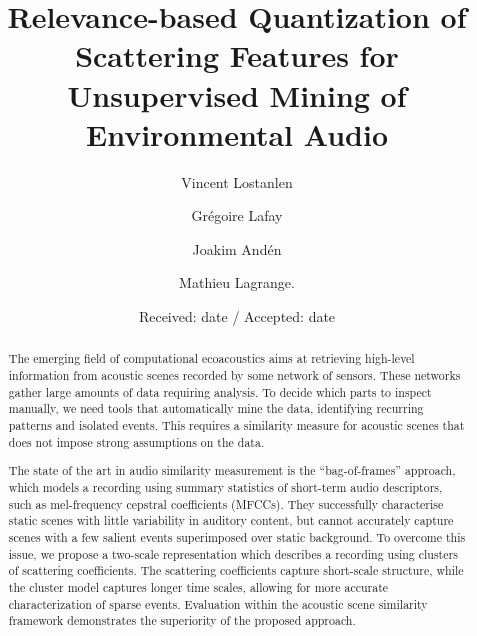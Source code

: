 \documentclass[smallextended]{svjour3}
\begin{document}
%
\title{Relevance-based Quantization of Scattering Features for Unsupervised Mining of Environmental Audio}


\author{Vincent Lostanlen         \and
		Gr\'egoire Lafay  \and Joakim And\'en  \and Mathieu Lagrange.}


\date{Received: date / Accepted: date}



\maketitle

\begin{abstract}
The emerging field of computational ecoacoustics aims at retrieving high-level information from acoustic scenes recorded by some network of sensors. These networks gather large amounts of data requiring analysis. To decide which parts to inspect manually, we need tools that automatically mine the data, identifying recurring patterns and isolated events. This requires a similarity measure for acoustic scenes that does not impose strong assumptions on the data.

The state of the art in audio similarity measurement is the ``bag-of-frames'' approach, which models a recording using summary statistics of short-term audio descriptors, such as mel-frequency cepstral coefficients (MFCCs). They successfully characterise static scenes with little variability in auditory content, but cannot accurately capture scenes with a few salient events superimposed over static background.
To overcome this issue, we propose a two-scale representation which describes a recording using clusters of scattering coefficients. The scattering coefficients capture short-scale structure, while the cluster model captures longer time scales, allowing for more accurate characterization of sparse events. Evaluation within the acoustic scene similarity framework demonstrates the superiority of the proposed approach.
\end{abstract}
\end{document}
